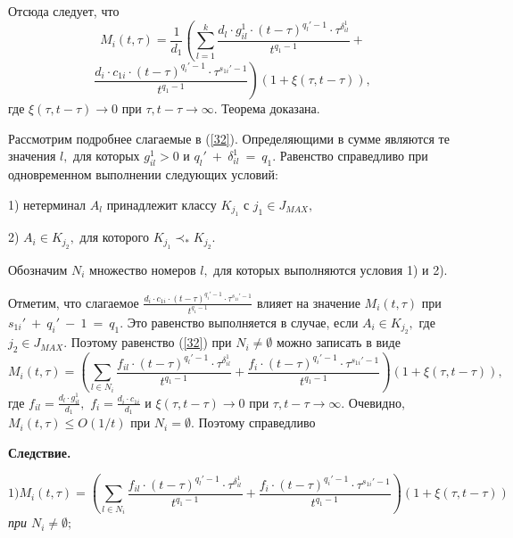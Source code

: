 \documentclass[12pt,russian]{article}
\begin{document}
{Отсюда следует, что
\begin{equation}
M_i(t,\tau)=
 \frac{1}{d_1}\left(\sum_{l=1}^{k} \frac{d_l \cdot g_{il}^1 \cdot (t-\tau)^{q_l'-1}\cdot \tau^{\delta_{il}^1}}{t^{q_1-1}}+ \right.
\label{32}
\end{equation}
$$
\left.
 \frac {d_i \cdot c_{1i}\cdot(t-\tau)^{q_i'-1} \cdot \tau^{s_{1i}'-1} }{t^{q_1-1}}\right) \left(1+\xi(\tau,t-\tau)\right),
$$
где $\xi(\tau,t-\tau) \rightarrow 0$ при $\tau,t-\tau\rightarrow \infty.$ Теорема доказана. 

\medskip

Рассмотрим подробнее слагаемые в (\ref{32}).
Определяющими в сумме являются те значения $l,$ для которых $g_{il}^1>0$ и $q_l'~+~\delta_{il}^1~=~q_1.$ Равенство справедливо при одновременном выполнении следующих условий:

1) нетерминал $A_l$ принадлежит классу $K_{j_1}$ с $j_1\in J_{MAX},$

2) $A_i \in K_{j_2},$ для которого $K_{j_1} \prec_* K_{j_2}.$

Обозначим $N_i$ множество номеров $l,$ для которых выполняются условия 1) и 2).

Отметим, что слагаемое $\frac {d_i \cdot c_{1i}\cdot(t-\tau)^{q_i'-1} \cdot \tau^{s_{1i}'-1} }{t^{q_1-1}} $ влияет на значение $M_i(t,\tau)$ при 
$s_{1i}'~+~q_i'~-~1~=~q_1.$ Это равенство выполняется в случае, если $A_i \in K_{j_2},$ где $j_2\in J_{MAX}.$
Поэтому равенство (\ref{32}) при $N_i \ne \emptyset$ можно записать в виде
$$
M_i(t,\tau)=
 \left(\sum_{l \in N_i} \frac{f_{il} \cdot (t-\tau)^{q_l'-1}\cdot \tau^{\delta_{il}^1}}{t^{q_1-1}}+ \frac {f_i \cdot(t-\tau)^{q_i'-1} \cdot \tau^{s_{1i}'-1} }{t^{q_1-1}}\right) \left(1+\xi(\tau,t-\tau)\right),
$$
где $f_{il}=\frac{d_l \cdot g_{il}^1}{d_1},$ $f_{i}=\frac {d_i \cdot c_{1i}}{d_1}$ и $\xi(\tau,t-\tau) \rightarrow 0$ при $\tau,t-\tau\rightarrow \infty.$
Очевидно, $M_i(t,\tau)\le O(1/t)$ при $N_i = \emptyset.$ 
Поэтому справедливо

\medskip
\textbf{Следствие.}
{\em
$$
1) M_i(t,\tau)=
 \left(\sum_{l \in N_i} \frac{f_{il} \cdot (t-\tau)^{q_l'-1}\cdot \tau^{\delta_{il}^1}}{t^{q_1-1}}+ \frac {f_i \cdot(t-\tau)^{q_i'-1} \cdot \tau^{s_{1i}'-1} }{t^{q_1-1}}\right) \left(1+\xi(\tau,t-\tau)\right)
$$
при $N_i \ne \emptyset;$

}}
\end{document}
